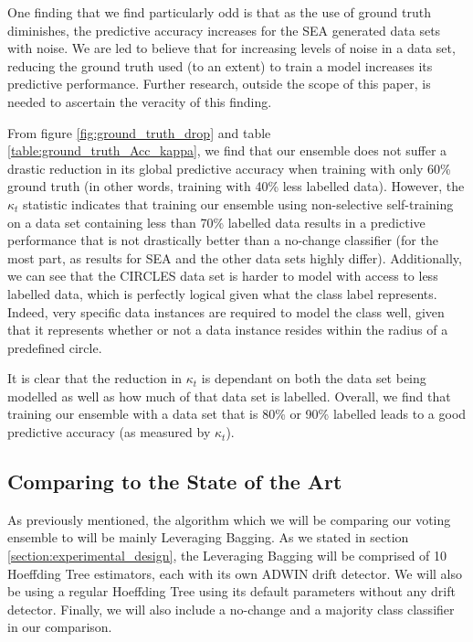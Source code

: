 \documentclass[runningheads]{llncs}
\begin{document}
One finding that we find particularly odd is that as the use of ground truth diminishes, the predictive accuracy increases for the SEA generated data sets with noise. We are led to believe that for increasing levels of noise in a data set, reducing the ground truth used (to an extent) to train a model increases its predictive performance. Further research, outside the scope of this paper, is needed to ascertain the veracity of this finding.

From figure \ref{fig:ground_truth_drop} and table \ref{table:ground_truth_Acc_kappa}, we find that our ensemble does not suffer a drastic reduction in its global predictive accuracy when training with only 60\% ground truth (in other words, training with 40\% less labelled data). However, the $\kappa_t$ statistic indicates that training our ensemble using non-selective self-training on a data set containing less than 70\% labelled data results in a predictive performance that is not drastically better than a no-change classifier (for the most part, as results for SEA and the other data sets highly differ). Additionally, we can see that the CIRCLES data set is harder to model with access to less labelled data, which is perfectly logical given what the class label represents. Indeed, very specific data instances are required to model the class well, given that it represents whether or not a data instance resides within the radius of a predefined circle.

It is clear that the reduction in $\kappa_t$ is dependant on both the data set being modelled as well as how much of that data set is labelled. Overall, we find that training our ensemble with a data set that is 80\% or 90\% labelled leads to a good predictive accuracy (as measured by $\kappa_t$).

\subsection{Comparing to the State of the Art}

As previously mentioned, the algorithm which we will be comparing our voting ensemble to will be mainly Leveraging Bagging. As we stated in section \ref{section:experimental_design}, the Leveraging Bagging will be comprised of 10 Hoeffding Tree estimators, each with its own ADWIN drift detector. We will also be using a regular Hoeffding Tree using its default parameters without any drift detector. Finally, we will also include a no-change and a majority class classifier in our comparison.
\end{document}
